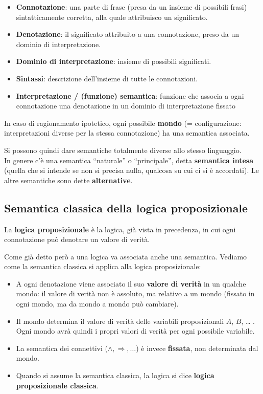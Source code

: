 \documentclass[
  a4paper,
]{article}
\providecommand{\tightlist}{%
  \setlength{\itemsep}{0pt}\setlength{\parskip}{0pt}}
\begin{document}
\begin{itemize}
\tightlist
\item
  \textbf{Connotazione}: una parte di frase (presa da un insieme di
  possibili frasi) sintatticamente corretta, alla quale attribuisco un
  significato.
\item
  \textbf{Denotazione}: il significato attribuito a una connotazione,
  preso da un dominio di interpretazione.
\item
  \textbf{Dominio di interpretazione}: insieme di possibili significati.
\item
  \textbf{Sintassi}: descrizione dell'insieme di tutte le connotazioni.
\item
  \textbf{Interpretazione / (funzione) semantica}: funzione che associa
  a ogni connotazione una denotazione in un dominio di interpretazione
  fissato
\end{itemize}

In caso di ragionamento ipotetico, ogni possibile \textbf{mondo} (=
configurazione: interpretazioni diverse per la stessa connotazione) ha
una semantica associata.

Si possono quindi dare semantiche totalmente diverse allo stesso
linguaggio.\\
In genere c'è una semantica ``naturale'' o ``principale'', detta
\textbf{semantica intesa} (quella che si intende se non si precisa
nulla, qualcosa su cui ci si è accordati). Le altre semantiche sono
dette \textbf{alternative}.

\hypertarget{semantica-classica-della-logica-proposizionale}{%
\subsection{Semantica classica della logica
proposizionale}\label{semantica-classica-della-logica-proposizionale}}

La \textbf{logica proposizionale} è la logica, già vista in precedenza,
in cui ogni connotazione può denotare un valore di verità.

Come già detto però a una logica va associata anche una semantica.
Vediamo come la semantica classica si applica alla logica
proposizionale:

\begin{itemize}
\tightlist
\item
  A ogni denotazione viene associato il suo \textbf{valore di verità} in
  un qualche mondo: il valore di verità non è assoluto, ma relativo a un
  mondo (fissato in ogni mondo, ma da mondo a mondo può cambiare).
\item
  Il mondo determina il valore di verità delle variabili proposizionali
  \(A\), \(B\), \ldots{} . Ogni mondo avrà quindi i propri valori di
  verità per ogni possibile variabile.
\item
  La semantica dei connettivi (\(\land , \Rightarrow , \dots\)) è invece
  \textbf{fissata}, non determinata dal mondo.
\item
  Quando si assume la semantica classica, la logica si dice
  \textbf{logica proposizionale classica}.
\end{itemize}
\end{document}

